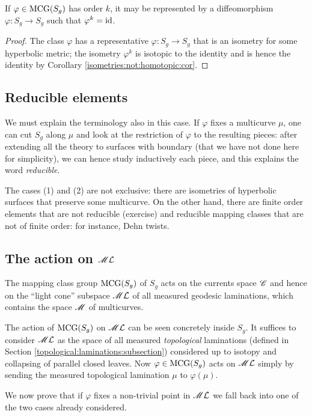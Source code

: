 \begin{cor}
If $\varphi\in{\rm MCG}(S_g)$ has order $k$, it may be represented by a diffeomorphism $\varphi\colon S_g\to S_g$ such that $\varphi^k = {\rm id}$.
\end{cor}
\begin{proof}
The class $\varphi$ has a representative $\varphi\colon S_g \to S_g$ that is an isometry for some hyperbolic metric; the isometry $\varphi^k$ is isotopic to the identity and is hence the identity by Corollary \ref{isometries:not:homotopic:cor}.
\end{proof}

\subsection{Reducible elements}
We must explain the terminology also in this case.
If $\varphi$ fixes a multicurve $\mu$, one can cut $S_g$ along $\mu$ and look at the restriction of $\varphi$ to the resulting pieces: after extending all the theory to surfaces with boundary (that we have not done here for simplicity), we can hence study inductively each piece, and this explains the word \emph{reducible}.

The cases (1) and (2) are not exclusive: there are isometries of hyperbolic surfaces that preserve some multicurve. On the other hand, there are finite order elements that are not reducible (exercise) and reducible mapping classes that are not of finite order: for instance, Dehn twists. 

\subsection{The action on $\mathscr{M}\mathcal{L}$}
The mapping class group ${\rm MCG}(S_g)$ of $S_g$ acts on the currents space $\mathscr{C}$ and hence on the ``light cone'' subspace $\mathscr{M}\mathcal{L}$ of all measured geodesic laminations, which contains the space $\mathscr{M}$ of multicurves. 

The action of ${\rm MCG}(S_g)$ on $\mathscr{M}\mathcal{L}$ can be seen concretely inside $S_g$. It suffices to consider $\mathscr{M}\mathcal{L}$ as the space of all measured \emph{topological} laminations (defined in Section \ref{topological:laminations:subsection}) considered up to isotopy and collapsing of parallel closed leaves. 
Now $\varphi\in{\rm MCG}(S_g)$ acts on $\mathscr{M}\mathcal{L}$ simply by sending the measured topological lamination $\mu$ to $\varphi(\mu)$. 

We now prove that if $\varphi$ fixes a non-trivial point in $\mathscr{M}\mathcal{L}$ we fall back into one of the two cases already considered.


